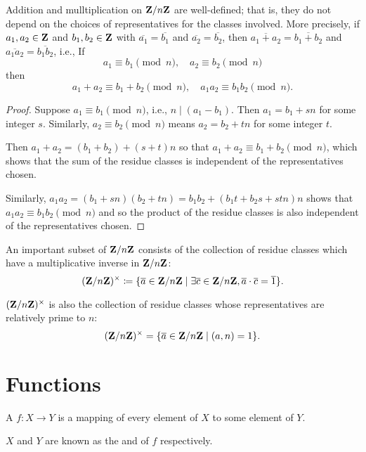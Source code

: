 \begin{example}
\begin{proposition}
Addition and mulltiplication on $\mathbf Z/n\mathbf Z$ are well-defined; that is, they do not depend on the choices of representatives for the classes involved. More precisely, if $a_1,a_2\in\mathbf Z$ and $b_1,b_2\in\mathbf Z$ with $\overline{a_1}=\overline{b_1}$ and $\overline{a_2}=\overline{b_2}$, then $\overline{a_1+a_2}=\overline{b_1+b_2}$ and $\overline{a_1a_2}=\overline{b_1b_2}$, i.e., If
\[a_1\equiv b_1\pmod n,\quad a_2\equiv b_2\pmod n\]
then
\[a_1+a_2\equiv b_1+b_2\pmod n,\quad a_1a_2\equiv b_1b_2\pmod n.\]
\end{proposition}

\begin{proof}
Suppose $a_1\equiv b_1\pmod n$, i.e., $n\mid(a_1-b_1)$. Then $a_1=b_1+sn$ for some integer $s$. Similarly, $a_2\equiv b_2\pmod n$ means $a_2=b_2+tn$ for some integer $t$.

Then $a_1+a_2=(b_1+b_2)+(s+t)n$ so that $a_1+a_2\equiv b_1+b_2\pmod n$, which shows that the sum of the residue classes is independent of the representatives chosen.

Similarly, $a_1a_2=(b_1+sn)(b_2+tn)=b_1b_2+(b_1t+b_2s+stn)n$ shows that $a_1a_2\equiv b_1b_2\pmod n$ and so the product of the residue classes is also independent of the representatives chosen.
\end{proof}

An important subset of $\mathbf Z/n\mathbf Z$ consists of the collection of residue classes which have a multiplicative inverse in $\mathbf Z/n\mathbf Z$:
\[(\mathbf Z/n\mathbf Z)^\times\coloneqq\{\overline{a}\in\mathbf Z/n\mathbf Z\mid\exists\overline{c}\in\mathbf Z/n\mathbf Z,\overline{a}\cdot\overline{c}=\overline{1}\}.\]

\begin{proposition}
$(\mathbf Z/n\mathbf Z)^\times$ is also the collection of residue classes whose representatives are relatively prime to $n$:
\[(\mathbf Z/n\mathbf Z)^\times=\{\overline{a}\in\mathbf Z/n\mathbf Z\mid(a,n)=1\}.\]
\end{proposition}
\end{example}
\pagebreak

\section{Functions}
\begin{definition}[Function]
A  $f:X\to Y$ is a mapping of every element of $X$ to some element of $Y$.

$X$ and $Y$ are known as the  and  of $f$ respectively.
\end{definition}

